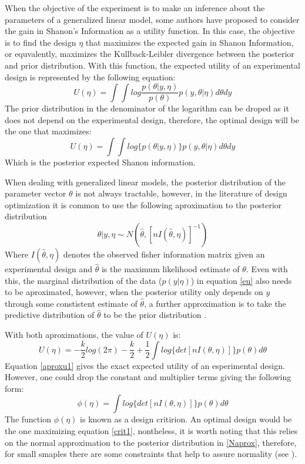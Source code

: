 \documentclass[preprint,review,12pt]{elsarticle}
\begin{document}
When the objective of the experiment is to make an inference about the parameters of a generalized linear model, some authors \citep[e.g.][]{Ber1979} have proposed to consider the gain in Shanon's Information as a utility function. In this case, the objective is to find the design $\eta$ that maximizes the expected gain in Shanon Information, or equvalently, maximizes the Kullback-Leibler divergence between the posterior and prior distribution. With this function, the expected utility of an experimental design is represented by the following equation:
\begin{equation}
U(\eta)=\int \int log\frac{p(\theta|y,\eta)}{p(\theta)} p(y,\theta |\eta) d\theta dy
\label{klu}
\end{equation}
The prior distribution in the denominator of the logarithm can be droped as it does not depend on the experimental design, therefore, the optimal design will be the one that maximizes:
\begin{equation}
U(\eta)=\int \int log \{p(\theta|y,\eta)\} p(y,\theta |\eta) d\theta dy
\label{egShanon}
\end{equation}
Which is the posterior expected Shanon information.

When dealing with generalized linear models, the posterior distribution of the parameter vector $\theta$ is not always tractable, however, in the literature of design optimization it is common to use the following aproximation to the posterior distribution
\begin{equation}
\theta|y,\eta \sim N\left(\hat{\theta},[nI(\hat{\theta},\eta)]^{-1}\right)
\label{Naprox}
\end{equation}
Where $I(\hat{\theta},\eta)$ denotes the observed fisher information matrix given an experimental design and $\hat{\theta}$ is the maximum likelihood estimate of $\theta$. Even with this, the marginal distribution of the data ($p(y|\eta)$) in equation \ref{eu} also needs to be aproximated, however, when the posterior utility only depends on $y$ through some constistent estimate of $\hat{\theta}$, a further approximation is to take the predictive distribution of  $\hat{\theta}$ to be the prior distribution \cite{chalar1989}.

With both aproximations, the value of $U(\eta)$ is:
\begin{equation}
U(\eta)=-\frac{k}{2}log(2\pi)-\frac{k}{2}+\frac{1}{2} \int log \{det[nI(\theta,\eta)]\} p(\theta) d\theta
\label{aproxu1}
\end{equation}
Equation \ref{aproxu1} gives the exact expected utility of an esperimental design. However, one could drop the constant and multiplier terms giving the following form:
\begin{equation}
\phi(\eta)= \int log \{det[nI(\theta,\eta)]\} p(\theta) d\theta
\label{crit1}
\end{equation}
The function $\phi(\eta)$ is known as a design critirion. An optimal design would be the one maximizing equation \ref{crit1}, nontheless, it is worth noting that this relies on the normal approximation to the posterior distribution in \ref{Naprox}, therefore, for small smaples there are some constraints that help to assure normality (see \cite{CLCH2002}).
\end{document}
